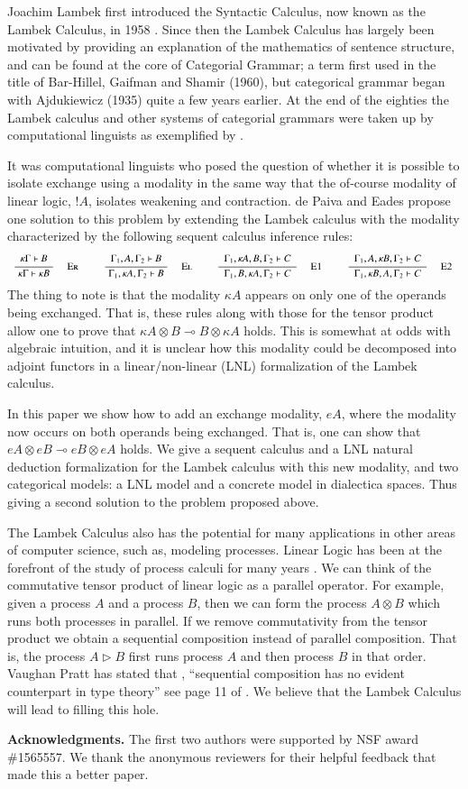 Joachim Lambek first introduced the Syntactic Calculus, now known as
the Lambek Calculus, in 1958 \cite{Lambek1958}.  Since then the Lambek
Calculus has largely been motivated by providing an explanation of the
mathematics of sentence structure, and can be found at the core of
Categorial Grammar; a term first used in the title of Bar-Hillel,
Gaifman and Shamir (1960), but categorical grammar began with
Ajdukiewicz (1935) quite a few years earlier. At the end of the
eighties the Lambek calculus and other systems of categorial grammars
were taken up by computational linguists as exemplified by
\cite{oehrle2012categorial,moortgat1988categorial,Barry:1991:PFS:977180.977215,hepple1990grammar}.

It was computational linguists who posed the question of whether it is
possible to isolate exchange using a modality in the same way that the
of-course modality of linear logic, $!A$, isolates weakening and
contraction.  de Paiva and Eades \cite{dePaiva2018} propose one
solution to this problem by extending the Lambek calculus with the
modality characterized by the following sequent calculus inference
rules:
\[
\small
\begin{array}{ccccccccccccccccccccc}  
  {\displaystyle\frac{\begin{array}{l}   \kappa \Gamma \vdash \mathit{B}  \\ \end{array}}{ \kappa \Gamma \vdash \kappa \mathit{B} }\quad\textsc{ {\textsc{Er}}{} }} & & {\displaystyle\frac{\begin{array}{l}  \Gamma_{{\mathrm{1}}} , \mathit{A} , \Gamma_{{\mathrm{2}}} \vdash \mathit{B}  \\ \end{array}}{ \Gamma_{{\mathrm{1}}} , \kappa \mathit{A} , \Gamma_{{\mathrm{2}}} \vdash \mathit{B} }\quad\textsc{ {\textsc{El}}{} }} & & {\displaystyle\frac{\begin{array}{l}  \Gamma_{{\mathrm{1}}} , \kappa \mathit{A} , \mathit{B} , \Gamma_{{\mathrm{2}}} \vdash \mathit{C}  \\ \end{array}}{ \Gamma_{{\mathrm{1}}} , \mathit{B} , \kappa \mathit{A} , \Gamma_{{\mathrm{2}}} \vdash \mathit{C} }\quad\textsc{ {\textsc{E1}}{} }} & & {\displaystyle\frac{\begin{array}{l}  \Gamma_{{\mathrm{1}}} , \mathit{A} , \kappa \mathit{B} , \Gamma_{{\mathrm{2}}} \vdash \mathit{C}  \\ \end{array}}{ \Gamma_{{\mathrm{1}}} , \kappa \mathit{B} , \mathit{A} , \Gamma_{{\mathrm{2}}} \vdash \mathit{C} }\quad\textsc{ {\textsc{E2}}{} }} 
\end{array}
\]
The thing to note is that the modality $\kappa A$ appears on only one
of the operands being exchanged.  That is, these rules along with
those for the tensor product allow one to prove that $\kappa A \otimes
B \multimap B \otimes \kappa A$ holds.  This is somewhat at odds with
algebraic intuition, and it is unclear how this modality could be
decomposed into adjoint functors in a linear/non-linear (LNL)
formalization of the Lambek calculus.

In this paper we show how to add an exchange modality, $eA$, where the
modality now occurs on both operands being exchanged. That is, one can
show that $eA \otimes eB \multimap eB \otimes eA$ holds.  We give a sequent
calculus and a LNL natural deduction formalization for the Lambek calculus
with this new modality, and two categorical models: a LNL model and a
concrete model in dialectica spaces. Thus giving a second solution to the
problem proposed above.

The Lambek Calculus also has the potential for many applications in
other areas of computer science, such as, modeling processes.  Linear
Logic has been at the forefront of the study of process calculi for
many years \cite{HONDA20102223,Pratt:1997,ABRAMSKY19945}. We can think
of the commutative tensor product of linear logic as a parallel
operator.  For example, given a process $A$ and a process $B$, then we
can form the process $A \otimes B$ which runs both processes in
parallel.  If we remove commutativity from the tensor product we
obtain a sequential composition instead of parallel composition.  That
is, the process $A \rhd B$ first runs process $A$ and then process $B$
in that order.  Vaughan Pratt has stated that , ``sequential
composition has no evident counterpart in type theory'' see page 11 of
\cite{Pratt:1997}.  We believe that the Lambek Calculus will lead to
filling this hole.  

\textbf{Acknowledgments.}  The first two authors were supported by NSF
award \#1565557.  We thank the anonymous reviewers for their helpful
feedback that made this a better paper.

